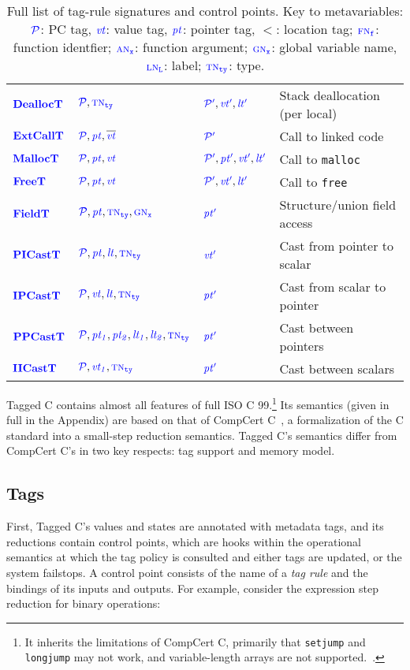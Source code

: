 \documentclass{llncs}
\begin{document}
\begin{table}[t]
\begin{tabular}{|l|l|l|l|}
    \(\dealloctname\)   & \(\dealloctargs\)      & \(\dealloctres\)   & Stack deallocation (per local) \\
    \(\extcalltname\)   & \(\extcalltargs\)      & \(\extcalltres\)   & Call to linked code \\
    \(\malloctname\)    & \(\malloctargs\)       & \(\malloctres\)    & Call to {\tt malloc} \\
    \(\freetname\)      & \(\freetargs\)         & \(\freetres\)      & Call to {\tt free} \\
    \(\fieldtname\)     & \(\fieldtargs\)        & \(\fieldtres\)     & Structure/union field access \\
    \(\picasttname\)    & \(\picasttargs\)       & \(\picasttres\)    & Cast from pointer to scalar \\
    \(\ipcasttname\)    & \(\ipcasttargs\)       & \(\ipcasttres\)    & Cast from scalar to pointer \\
    \(\ppcasttname\)    & \(\ppcasttargs\)       & \(\ppcasttres\)    & Cast between pointers \\
    \(\iicasttname\)    & \(\iicasttargs\)       & \(\iicasttres\)    & Cast between scalars \\
    \hline
  \end{tabular}

  \caption{Full list of tag-rule signatures and control points. Key to metavariables:
    \(\PCT\): PC tag, \(\vt\): value tag, \(\pt\): pointer tag, \(\lt\): location tag;
    \(\FN\): function identfier; \(\AN\): function argument; \(\GN\): global
    variable name, \(\LN\): label; \(\TN\): type.}
  \label{fig:controlpoints}
\end{table}

Tagged C contains almost all features of full ISO C 99.\footnote{
It inherits the limitations of CompCert C, primarily that {\tt setjump} and {\tt longjump}
may not work, and variable-length arrays are not supported.~\cite[Ch. 5]{Leroy22:CompCertManual}.}
Its semantics (given in full in the Appendix)
are based on that of CompCert C~\cite{Leroy09:CompCert},
a formalization of the C standard into a small-step reduction semantics.
Tagged C's semantics differ from CompCert C's in two key respects: tag support and memory model.

\subsection{Tags} First, Tagged C's values
and states are annotated with metadata tags, and its reductions contain
control points, which are hooks within the
operational semantics at which the tag policy is consulted and either tags are updated, or the system
failstops. A control point consists of the name of a {\em tag rule}
and the bindings of its inputs and outputs. For example, consider the expression step reduction
for binary operations:
\end{document}
